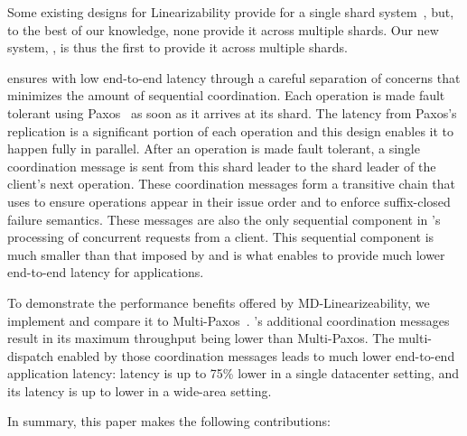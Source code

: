 Some existing designs for Linearizability provide \mdl{} for a single shard system~\cite{ongaro2014consensus}, but,
to the best of our knowledge, none provide it across multiple shards.
Our new system, \sys{}, is thus the first to provide it across multiple shards.

\sys{} ensures \mdl{} with low end-to-end latency through a careful separation of concerns that minimizes the amount of sequential coordination. %
Each operation is made fault tolerant using Paxos~\cite{lamport1998paxos} as soon as it arrives at its shard.
The latency from Paxos's replication is a significant portion of each operation and this design enables it to happen fully in parallel.
After an operation is made fault tolerant, a single coordination message is sent from this shard leader to the shard leader of the client's next operation.
These coordination messages form a transitive chain that \sys{} uses to ensure operations appear in their issue order and to enforce suffix-closed failure semantics.
These messages are also the only sequential component in \sys{}'s processing of concurrent requests from a client.
This sequential component is much smaller than that imposed by \sdl{} and is what enables \sys{} to provide much lower end-to-end latency for applications.



To demonstrate the performance benefits offered by MD-Linearizeability,
we implement \sys{} and compare it to Multi-Paxos~\cite{lamport1998paxos}.
\sys{}'s additional coordination messages result in its maximum throughput being  lower than Multi-Paxos.
The multi-dispatch enabled by those coordination messages leads to much lower end-to-end application latency:
\sys{} latency is up to 75\% lower in a single datacenter setting,
and its latency is up to  lower in a wide-area setting.


In summary, this paper makes the following contributions:


